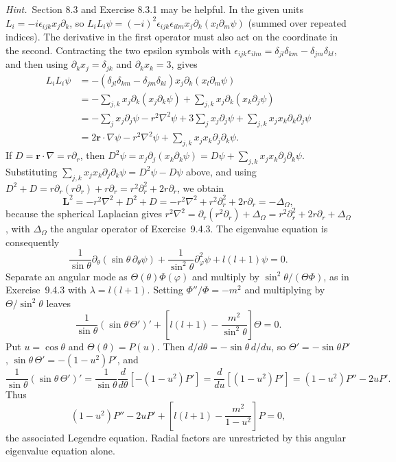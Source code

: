 \emph{Hint.}~Section 8.3 and Exercise 8.3.1 may be helpful.
\solution
In the given units $L_i=-i\epsilon_{ijk}x_j\partial_k$, so
$L_iL_i\psi=(-i)^2\epsilon_{ijk}\epsilon_{ilm}x_j\partial_k(x_l\partial_m\psi)$
(summed over repeated indices).
The derivative in the first operator must also act on the coordinate
in the second.  Contracting the two epsilon symbols with
$\epsilon_{ijk}\epsilon_{ilm}=\delta_{jl}\delta_{km}-\delta_{jm}\delta_{kl}$,
and then using $\partial_kx_j=\delta_{jk}$ and $\partial_kx_k=3$, gives
\begin{align*}
L_iL_i\psi
&=-(\delta_{jl}\delta_{km}-\delta_{jm}\delta_{kl})
 x_j\partial_k(x_l\partial_m\psi)\\
&=-\sum_{j,k}x_j\partial_k(x_j\partial_k\psi)
  +\sum_{j,k}x_j\partial_k(x_k\partial_j\psi)\\
&=-\sum_jx_j\partial_j\psi-r^2\nabla^2\psi
  +3\sum_jx_j\partial_j\psi
  +\sum_{j,k}x_jx_k\partial_k\partial_j\psi\\
&=2\mathbf r\cdot\nabla\psi-r^2\nabla^2\psi
 +\sum_{j,k}x_jx_k\partial_j\partial_k\psi.
\end{align*}
If $D=\mathbf r\cdot\nabla=r\partial_r$, then
$D^2\psi=x_j\partial_j(x_k\partial_k\psi)
=D\psi+\sum_{j,k}x_jx_k\partial_j\partial_k\psi$.
Substituting $\sum_{j,k}x_jx_k\partial_j\partial_k\psi=D^2\psi-D\psi$
above, and using $D^2+D=r\partial_r(r\partial_r)+r\partial_r
=r^2\partial_r^2+2r\partial_r$, we obtain
\[
\mathbf L^2=-r^2\nabla^2+D^2+D
=-r^2\nabla^2+r^2\partial_r^2+2r\partial_r
=-\Delta_\Omega,
\]
because the spherical Laplacian gives
$r^2\nabla^2=\partial_r(r^2\partial_r)+\Delta_\Omega
=r^2\partial_r^2+2r\partial_r+\Delta_\Omega$, with $\Delta_\Omega$ the
angular operator of Exercise~9.4.3.
The eigenvalue equation is consequently
\[
\frac1{\sin\theta}\partial_\theta(\sin\theta\,\partial_\theta\psi)
+\frac1{\sin^2\theta}\partial_\varphi^2\psi
+l(l+1)\psi=0.
\]
Separate an angular mode as $\Theta(\theta)\Phi(\varphi)$ and
multiply by $\sin^2\theta/(\Theta\Phi)$, as in Exercise~9.4.3 with
$\lambda=l(l+1)$.  Setting $\Phi''/\Phi=-m^2$ and multiplying by
$\Theta/\sin^2\theta$ leaves
\[
\frac1{\sin\theta}(\sin\theta\,\Theta')'
+\left[l(l+1)-\frac{m^2}{\sin^2\theta}\right]\Theta=0.
\]
Put $u=\cos\theta$ and $\Theta(\theta)=P(u)$.  Then
$d/d\theta=-\sin\theta\,d/du$, so $\Theta'=-\sin\theta P'$,
$\sin\theta\,\Theta'=-(1-u^2)P'$, and
\[
\frac1{\sin\theta}(\sin\theta\,\Theta')'
=\frac1{\sin\theta}\frac{d}{d\theta}[-(1-u^2)P']
=\frac{d}{du}[(1-u^2)P']
=(1-u^2)P''-2uP'.
\]
Thus
\[
\boxed{(1-u^2)P''-2uP'
 +\left[l(l+1)-\frac{m^2}{1-u^2}\right]P=0},
\]
the associated Legendre equation.  Radial factors are unrestricted by
this angular eigenvalue equation alone.


